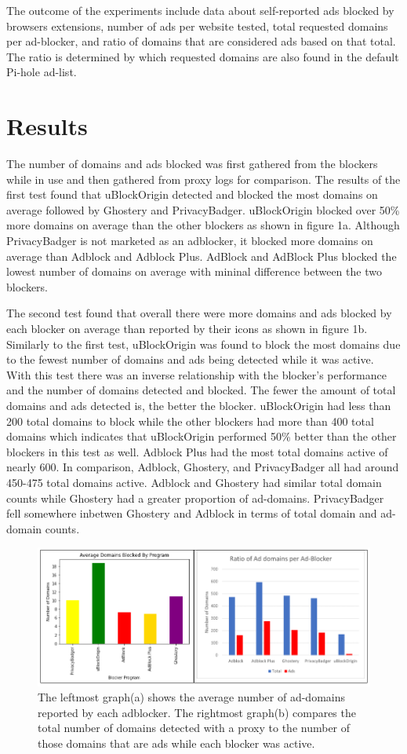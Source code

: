 \documentclass[sigsmall]{acmart}
\begin{document}
The outcome of the experiments include data about self-reported ads blocked by browsers extensions, number of ads per website tested, total requested domains per ad-blocker, and ratio of domains that are considered ads based on that total. The ratio is determined by which requested domains are also found in the default Pi-hole ad-list.
\section*{Results}
The number of domains and ads blocked was first gathered from the blockers while in use and then gathered from proxy logs for comparison. The results of the first test found that uBlockOrigin detected and blocked the most domains on average followed by Ghostery and PrivacyBadger. uBlockOrigin blocked over 50\% more domains on average than the other blockers as shown in figure 1a. Although PrivacyBadger is not marketed as an adblocker, it blocked more domains on average than Adblock and Adblock Plus. 
AdBlock and AdBlock Plus blocked the lowest number of domains on average with mininal difference between the two blockers.  
 
The second test found that overall there were more domains and ads blocked by each blocker on average than reported by their icons as shown in figure 1b. Similarly to the first test, uBlockOrigin was found to block the most domains due to the fewest number of domains and ads being detected while it was active. With this test there was an inverse relationship with the blocker's performance and the number of domains detected and blocked. The fewer the amount of total domains and ads detected is, the better the blocker. uBlockOrigin had less than 200 total domains to block while the other blockers had more than 400 total domains which indicates that uBlockOrigin performed 50\% better than the other blockers in this test as well. Adblock Plus had the most total domains active of nearly 600. In comparison, Adblock, Ghostery, and PrivacyBadger all had around 450-475 total domains active. Adblock and Ghostery had similar total domain counts while Ghostery had a greater proportion of ad-domains. PrivacyBadger fell somewhere inbetwen Ghostery and Adblock in terms of total domain and ad-domain counts.   
\begin{figure}[h]
  \includegraphics[scale = 0.75]{Edit3.png}
  \caption{ The leftmost graph(a) shows the average number of ad-domains reported by each adblocker. The rightmost graph(b) compares the total number of domains detected with a proxy to the number of those domains that are ads while each blocker was active.}
  \label{fig:graph1ab}
\end{figure}
\end{document}
